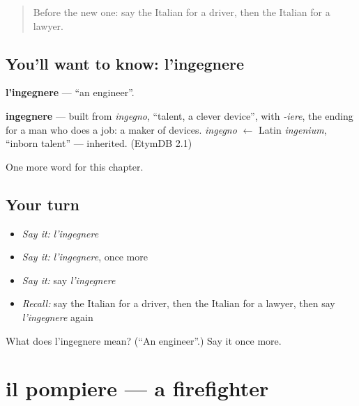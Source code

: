 \label{lesson:IT-C112-ingegnere}



\begin{quote}
Before the new one: say the Italian for a driver, then the Italian for a lawyer.
\end{quote}

\subsection*{You'll want to know: l'ingegnere}
\textbf{l'ingegnere} — \textquotedblleft{}an engineer\textquotedblright{}.

\begin{cousinweb}
\textbf{ingegnere} — built from \emph{ingegno}, \textquotedblleft{}talent, a clever device\textquotedblright{}, with \emph{-iere}, the ending for a man who does a job: a maker of devices. \emph{ingegno} $\leftarrow$ Latin \emph{ingenium}, \textquotedblleft{}inborn talent\textquotedblright{} — inherited. (EtymDB 2.1)
\end{cousinweb}

\begin{grammarlens}[title={What you've built}]
One more word for this chapter.
\end{grammarlens}

\subsection*{Your turn}
\begin{itemize}
\raggedright
  \item \emph{Say it:} \emph{l'ingegnere}
  \item \emph{Say it:} \emph{l'ingegnere}, once more
  \item \emph{Say it:} say \emph{l'ingegnere}
  \item \emph{Recall:} say the Italian for a driver, then the Italian for a lawyer, then say \emph{l'ingegnere} again
\end{itemize}

\begin{tcolorbox}[breakable,colback=teal!4,colframe=teal!35!black,title={Before you move on}]
What does l'ingegnere mean? (\textquotedblleft{}An engineer\textquotedblright{}.) Say it once more.
\end{tcolorbox}
\section[il pompiere]{il pompiere — a firefighter}

